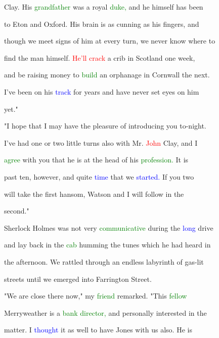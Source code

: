  Clay. His \textcolor{green}{grandfather} was a royal \textcolor{green}{duke,} and he himself has been

 to Eton and Oxford. His brain is as \textcolor{BurntOrange}{cunning} as his fingers, and

 though we meet signs of him at every turn, we never know where to

 find the man himself. \textcolor{red}{He'll} \textcolor{red}{crack} a crib in Scotland one week,

 and be raising \textcolor{BurntOrange}{money} to \textcolor{green}{build} an orphanage in Cornwall the next.

 I've been on his \textcolor{blue}{track} for years and have never set eyes on him

 yet."



 "I \textcolor{BurntOrange}{hope} that I may have the pleasure of introducing you to-night.

 I've had one or two little turns also with Mr. \textcolor{red}{John} Clay, and I

 \textcolor{green}{agree} with you that he is at the head of his \textcolor{green}{profession.} It is

 past ten, however, and quite \textcolor{blue}{time} that we \textcolor{blue}{started.} If you two

 will take the first hansom, Watson and I will follow in the

 second."



 Sherlock Holmes was not very \textcolor{green}{communicative} during the \textcolor{blue}{long} drive

 and lay back in the \textcolor{green}{cab} humming the tunes which he had heard in

 the afternoon. We rattled through an \textcolor{BurntOrange}{endless} \textcolor{BurntOrange}{labyrinth} of gas-lit

 streets until we emerged into Farrington Street.



 "We are close there now," my \textcolor{green}{friend} remarked. "This \textcolor{green}{fellow}

 Merryweather is a \textcolor{green}{bank} \textcolor{green}{director,} and personally \textcolor{BurntOrange}{interested} in the

 matter. I \textcolor{blue}{thought} it as well to have Jones with us also. He is

